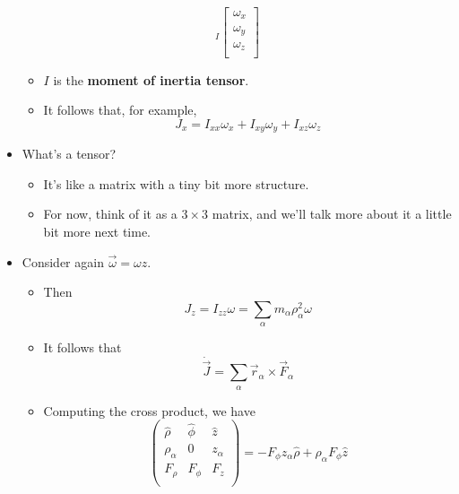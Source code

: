 \documentclass[../notes.tex]{subfiles}
\begin{document}
\begin{itemize}
\begin{equation*}
{        }_I
        \begin{bmatrix}
            \omega_x\\
            \omega_y\\
            \omega_z\\
        \end{bmatrix}
    \end{equation*}
    \begin{itemize}
        \item $I$ is the \textbf{moment of inertia tensor}.
        \item It follows that, for example,
        \begin{equation*}
            J_x = I_{xx}\omega_x+I_{xy}\omega_y+I_{xz}\omega_z
        \end{equation*}
    \end{itemize}
    \item What's a tensor?
    \begin{itemize}
        \item It's like a matrix with a tiny bit more structure.
        \item For now, think of it as a $3\times 3$ matrix, and we'll talk more about it a little bit more next time.
    \end{itemize}
    \item Consider again $\vec{\omega}=\omega\hat{z}$.
    \begin{itemize}
        \item Then
        \begin{equation*}
            J_z = I_{zz}\omega
            = \sum_\alpha m_\alpha\rho_\alpha^2\omega
        \end{equation*}
        \item It follows that
        \begin{equation*}
            \dot{\vec{J}} = \sum_\alpha\vec{r}_\alpha\times\vec{F}_\alpha
        \end{equation*}
        \item Computing the cross product, we have
        \begin{equation*}
            \begin{pmatrix}
                \hat{\rho} & \hat{\phi} & \hat{z}\\
                \rho_\alpha & 0 & z_\alpha\\
                F_\rho & F_\phi & F_z\\
            \end{pmatrix}
            = -F_\phi z_\alpha\hat{\rho}+\rho_\alpha F_\phi\hat{z}

\end{equation*}
\end{itemize}
\end{itemize}
\end{document}
